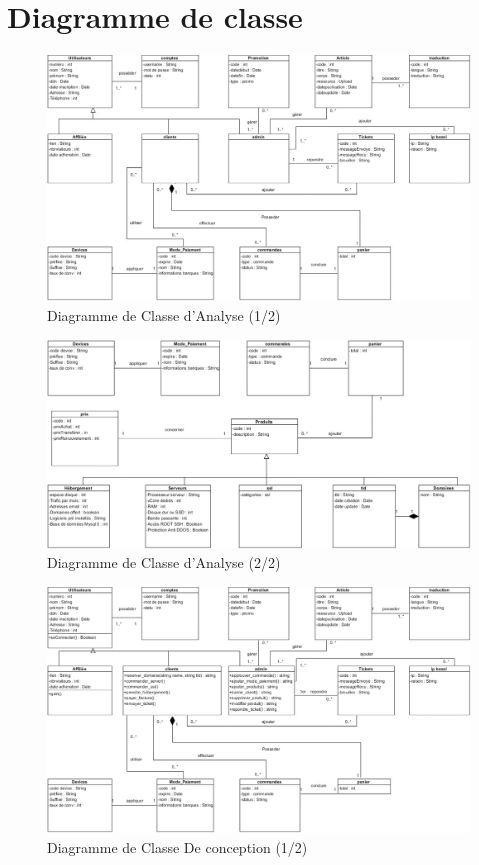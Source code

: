 \documentclass[a4paper, 12pt]{report}
\begin{document}
\section{Diagramme de classe}
\begin{figure}[H]
	\centering
	\includegraphics{img/diagclasse/1}
	\caption{Diagramme de Classe d’Analyse (1/2)}
	\label{Tux}
\end{figure}
\begin{figure}[H]
	\centering
	\includegraphics{img/diagclasse/2}
	\caption{Diagramme de Classe d’Analyse (2/2)}
		\label{Tux}
\end{figure}
	\begin{figure}[H]
		\centering
		\includegraphics{img/diagclasse/3}
		\caption{Diagramme de Classe De conception (1/2)}
		\label{Tux}
	\end{figure}
\end{document}
